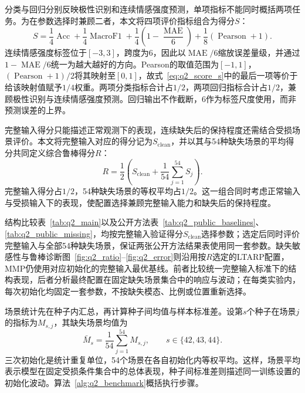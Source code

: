 \QTwoParagraph 分类与回归分别反映极性识别和连续情感强度预测，单项指标不能同时概括两项任务。为在参数选择时兼顾二者，本文将四项评价指标组合为得分$S$：
\begin{equation}
S = \frac{1}{4}\operatorname{Acc} + \frac{1}{4}\operatorname{MacroF1} + \frac{1}{4}\left(1 - \frac{\operatorname{MAE}}{6}\right) + \frac{1}{8}(\operatorname{Pearson} + 1).
\label{eq:q2_score_s}
\end{equation}
连续情感强度标签位于$[-3,3]$，跨度为6，因此以$\operatorname{MAE}/6$缩放误差量级，并通过$1-\operatorname{MAE}/6$统一为越大越好的方向。Pearson的取值范围为$[-1,1]$，$(\operatorname{Pearson}+1)/2$将其映射至$[0,1]$，故式~\eqref{eq:q2_score_s}中的最后一项等价于给该映射值赋予$1/4$权重。两项分类指标合计占$1/2$，两项回归指标合计占$1/2$，兼顾极性识别与连续情感强度预测。回归输出不作截断，6作为标签尺度使用，而非预测误差的上界。

\QTwoParagraph 完整输入得分只能描述正常观测下的表现，连续缺失后的保持程度还需结合受损场景评价。本文将完整输入对应的得分记为$S_{\mathrm{clean}}$，并以其与54种缺失场景的平均得分共同定义综合鲁棒得分$R$：
\begin{equation}
R = \frac{1}{2}\left(S_{\mathrm{clean}} + \frac{1}{54}\sum_{j=1}^{54} S_j\right).
\label{eq:q2_robust_r}
\end{equation}
完整输入得分占$1/2$，54种缺失场景的等权平均占$1/2$。这一组合同时考虑正常输入与受损输入下的表现，使配置选择兼顾完整输入能力和缺失后的保持程度。

\QTwoParagraph 结构比较表~\ref{tab:q2_main}以及公开方法表~\ref{tab:q2_public_baselines}、\ref{tab:q2_public_missing}，均按完整输入验证得分$S_{\mathrm{clean}}$选择参数；选定后同时评价完整输入与全部54种缺失场景，保证两张公开方法结果表使用同一套参数。缺失敏感性与鲁棒诊断图~\ref{fig:q2_ratio}--\ref{fig:q2_error}则沿用按$R$选定的LTARP配置，MMP仍使用对应初始化的完整输入最优基线。前者比较统一完整输入标准下的结构表现，后者分析最终配置在固定缺失场景集合中的响应与波动；在每类实验内，每次初始化均固定一套参数，不按缺失模态、比例或位置重新选择。

\QTwoParagraph 场景统计先在种子内汇总，再计算种子间均值与样本标准差。设第$s$个种子在场景$j$的指标为$M_{s,j}$，其缺失场景均值为
\begin{equation}
\bar M_s = \frac{1}{54}\sum_{j=1}^{54}M_{s,j}, \qquad s\in\{42,43,44\}.
\end{equation}
三次初始化是统计重复单位，54个场景在各自初始化内等权平均。这样，场景平均表示模型在固定受损条件集合中的总体表现，种子间标准差则描述同一训练设置的初始化波动。算法~\ref{alg:q2_benchmark}概括执行步骤。

